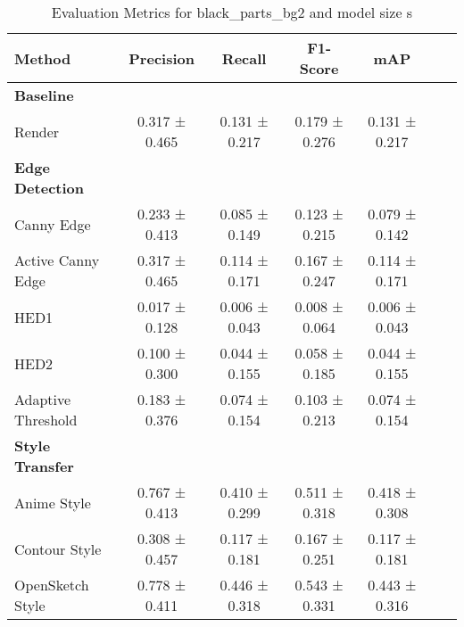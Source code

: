 \begin{table}[H]
    \scriptsize
    \caption{Evaluation Metrics for black_parts_bg2 and model size s}
    \begin{tabular}{lcccccc}
        \toprule
        \textbf{Method} & \textbf{Precision} & \textbf{Recall} & \textbf{F1-Score} & \textbf{mAP} \\
        \midrule
        \textbf{Baseline} & & & & \\
        Render & 0.317 ± 0.465 & 0.131 ± 0.217 & 0.179 ± 0.276 & 0.131 ± 0.217 \\
        \midrule
        \textbf{Edge Detection} & & & & \\
        Canny Edge & 0.233 ± 0.413 & 0.085 ± 0.149 & 0.123 ± 0.215 & 0.079 ± 0.142 \\
        Active Canny Edge & 0.317 ± 0.465 & 0.114 ± 0.171 & 0.167 ± 0.247 & 0.114 ± 0.171 \\
        HED1 & 0.017 ± 0.128 & 0.006 ± 0.043 & 0.008 ± 0.064 & 0.006 ± 0.043 \\
        HED2 & 0.100 ± 0.300 & 0.044 ± 0.155 & 0.058 ± 0.185 & 0.044 ± 0.155 \\
        Adaptive Threshold & 0.183 ± 0.376 & 0.074 ± 0.154 & 0.103 ± 0.213 & 0.074 ± 0.154 \\
        \midrule
        \textbf{Style Transfer} & & & & \\
        Anime Style & 0.767 ± 0.413 & 0.410 ± 0.299 & 0.511 ± 0.318 & 0.418 ± 0.308 \\
        Contour Style & 0.308 ± 0.457 & 0.117 ± 0.181 & 0.167 ± 0.251 & 0.117 ± 0.181 \\
        OpenSketch Style & 0.778 ± 0.411 & 0.446 ± 0.318 & 0.543 ± 0.331 & 0.443 ± 0.316 \\
        \bottomrule
    \end{tabular}
\end{table}
